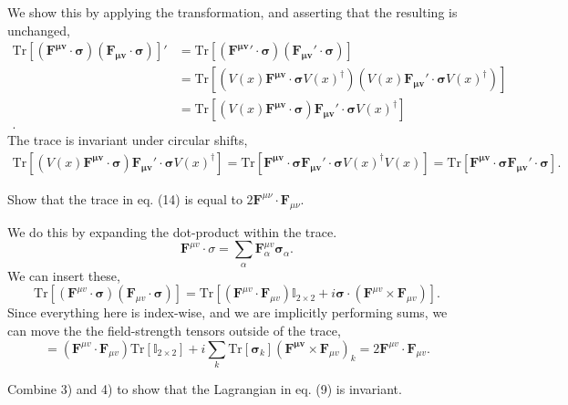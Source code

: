 \documentclass[working, oneside]{../../../Preambles/tuftebook}
\begin{document}
We show this by applying the transformation, and asserting that the resulting is unchanged,
\begin{align*}
    \text{Tr}\left[\left( \mathbf{F^{\mu  v}}\cdot \mathbf{\sigma} \right) \left( \mathbf{F_{\mu v}}\cdot \mathbf{\sigma} \right) \right]' &=
    \text{Tr}\left[\left( \mathbf{F^{\mu  v}}'\cdot \mathbf{\sigma} \right) \left( \mathbf{F_{\mu v}}'\cdot \mathbf{\sigma} \right) \right] \\
&= \text{Tr}\left[\left(V\left( x \right)  \mathbf{F^{\mu  v}}\cdot \mathbf{\sigma}V\left( x \right)^{\dagger}  \right) \left(V\left( x \right)  \mathbf{F_{\mu v}}'\cdot \mathbf{\sigma}V\left( x \right) ^{\dagger} \right) \right] \\
&= \text{Tr}\left[\left(V\left( x \right)  \mathbf{F^{\mu  v}}\cdot \mathbf{\sigma}  \right)   \mathbf{F_{\mu v}}'\cdot \mathbf{\sigma}V\left( x \right) ^{\dagger}  \right] \\
.\end{align*}
The trace is invariant under circular shifts,
\begin{align*}
 \text{Tr}\left[\left(V\left( x \right)  \mathbf{F^{\mu  v}}\cdot \mathbf{\sigma}  \right)   \mathbf{F_{\mu v}}'\cdot \mathbf{\sigma}V\left( x \right) ^{\dagger}  \right] =
 \text{Tr}\left[  \mathbf{F^{\mu  v}}\cdot \mathbf{\sigma}     \mathbf{F_{\mu v}}'\cdot \mathbf{\sigma}V\left( x \right) ^{\dagger}  V\left( x \right)\right] =
 \text{Tr}\left[  \mathbf{F^{\mu  v}}\cdot \mathbf{\sigma}     \mathbf{F_{\mu v}}'\cdot \mathbf{\sigma}\right] 
.\end{align*}
\begin{exercise}[4]
Show that the trace in eq. (14) is equal to \( 2 \mathbf{F}^{\mu\nu} \cdot \mathbf{F}_{\mu\nu} \).
\end{exercise}
We do this by expanding the dot-product within the trace.
\[
\mathbf{F}^{\mu  v}\cdot \sigma =  \sum_\alpha \mathbf{F}^{\mu v}_\alpha \mathbf{\sigma}_\alpha
.\] 
We can insert these,
\[
\text{Tr}\left[\left( \mathbf{F}^{\mu  v}\cdot  \mathbf{ \sigma} \right) \left( \mathbf{F}_{\mu  v}\cdot \mathbf{\sigma} \right) \right] = \text{Tr}\left[\left( \mathbf{F}^{\mu v}\cdot \mathbf{F}_{\mu v} \right)\mathbb{I}_{2\times 2} + i\mathbf{\sigma} \cdot \left( \mathbf{F}^{\mu v}\times \mathbf{F}_{\mu  v} \right)  \right]
.\] 
Since everything here is index-wise, and we are implicitly performing sums, we can move the the field-strength tensors outside of the trace,
\[
= \left( \mathbf{F}^{\mu v}\cdot \mathbf{F}_{\mu  v} \right) \text{Tr}\left[\mathbb{I}_{2\times 2}\right] + i  \sum_k\text{Tr}\left[\mathbf{\sigma}_{k}\right]\left( \mathbf{F^{\mu v}}\times \mathbf{F}_{\mu v} \right) _k = 2\mathbf{F}^{\mu v}\cdot \mathbf{F}_{\mu v}
.\] 
\begin{exercise}[5]
Combine 3) and 4) to show that the Lagrangian in eq. (9) is invariant.
\end{exercise}
\end{document}
